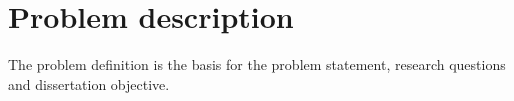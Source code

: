 \chapter{Problem description}
The problem definition is the basis for the problem statement, research questions and dissertation objective.









